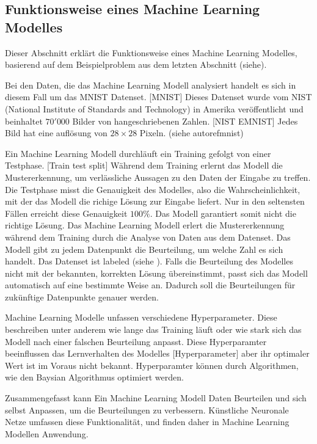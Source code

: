 \subsection{Funktionsweise eines Machine Learning Modelles}
\label{sub:t_ml_func}
Dieser Abschnitt erklärt die Funktionsweise eines Machine Learning Modelles,
basierend auf dem Beispielproblem aus dem letzten Abschnitt (siehe). 

Bei den Daten, die das Machine Learning Modell analysiert handelt es sich in
diesem Fall um das MNIST Datenset. [MNIST]  Dieses Datenset wurde vom NIST
(National Institute of Standards and Technology) in Amerika veröffentlicht und
beinhaltet $70'000$ Bilder von hangeschriebenen Zahlen. [NIST EMNIST] Jedes Bild
hat eine auflösung von $28\times28$ Pixeln. (siehe autoref{mnist})

                
Ein Machine Learning Modell durchläuft ein Training gefolgt von einer Testphase.
[Train test split] Während dem Training erlernt das Modell die Mustererkennung,
um verlässliche Aussagen zu den Daten der Eingabe zu treffen. Die Testphase
misst die Genauigkeit des Modelles, also die Wahrscheinlichkeit, mit der das
Modell die richige Lösung zur Eingabe liefert. Nur in den seltensten Fällen
erreicht diese Genauigkeit $100\%$. Das Modell garantiert somit nicht die
richtige Lösung. Das Machine Learning Modell erlert die Mustererkennung während
dem Training durch die Analyse von Daten aus dem Datenset. Das Modell gibt zu
jedem Datenpunkt die Beurteilung, um welche Zahl es sich handelt. Das Datenset
ist labeled (siehe ). Falls die Beurteilung des Modelles
nicht mit der bekannten, korrekten Lösung übereinstimmt, passt sich das Modell
automatisch auf eine bestimmte Weise an. Dadurch soll die Beurteilungen für
zukünftige Datenpunkte genauer werden.

Machine Learning Modelle unfassen verschiedene Hyperparameter. Diese beschreiben
unter anderem wie lange das Training läuft oder wie stark sich das Modell nach
einer falschen Beurteilung anpasst. Diese Hyperparamter beeinflussen das
Lernverhalten des Modelles [Hyperparameter] aber ihr optimaler Wert ist im
Voraus nicht bekannt. Hyperparamter können durch Algorithmen, wie den Baysian
Algorithmus optimiert werden.

Zusammengefasst kann Ein Machine Learning Modell Daten Beurteilen und sich
selbst Anpassen, um die Beurteilungen zu verbessern. Künstliche Neuronale Netze
umfassen diese Funktionalität, und finden daher in Machine Learning Modellen
Anwendung.

